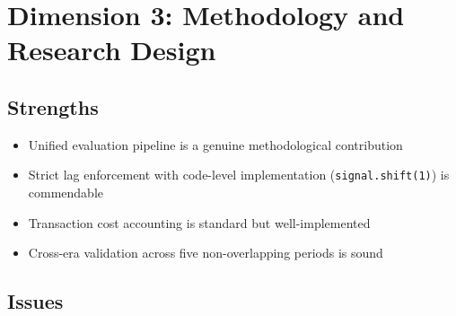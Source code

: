 \documentclass[12pt,a4paper]{article}
\begin{document}
\section{Dimension 3: Methodology and Research Design}
\label{sec:d3}

\subsection*{Strengths}
\begin{itemize}
    \item Unified evaluation pipeline is a genuine methodological contribution
    \item Strict lag enforcement with code-level implementation (\texttt{signal.shift(1)}) is commendable
    \item Transaction cost accounting is standard but well-implemented
    \item Cross-era validation across five non-overlapping periods is sound
\end{itemize}

\subsection*{Issues}
\end{document}
